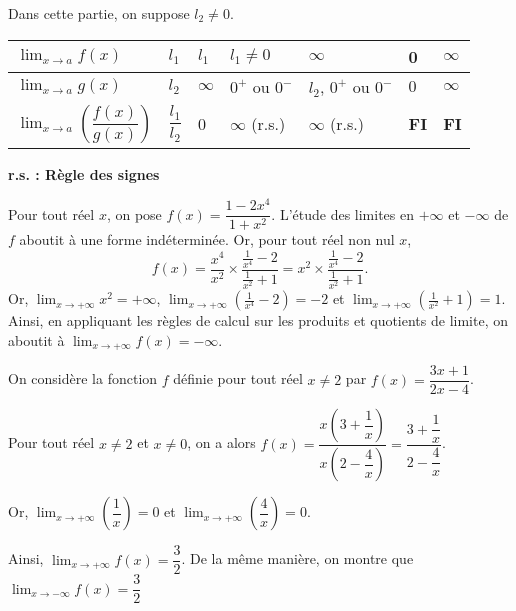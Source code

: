 \documentclass[11pt,fleqn, openany]{book} %
\begin{document}
\begin{proposition} Dans cette partie, on suppose $l_2 \neq 0$.
\begin{center}

\begin{tabularx}{\linewidth}{|l|X|X|X|X|X|X|}
\hline
$\displaystyle \lim_{x \to a} f(x)$ & $l_1 $ & $l_1$ & $l_1 \neq 0$ & $\infty$ & 0 & $\infty$ \\
\hline
$\displaystyle \lim_{x \to a} g(x)$ & $l_2$ & $\infty$ &  $0^+$ ou $0^-$ & $l_2$, $0^+$ ou $0^-$  & $0$ & $\infty$ \\
\hline
$\displaystyle \lim_{x \to a} \left(\dfrac{f(x)}{g(x)}\right)$ & $\dfrac{l_1}{l_2}$ & 0 & $\infty$ (r.s.) & $\infty$ (r.s.) & \textbf{FI} & \textbf{FI} \\
\hline
\end{tabularx}

 \textbf{r.s. : Règle des signes}
 \end{center} \vspace{-1cm}
\end{proposition}

\begin{example}Pour tout réel $x$, on pose $f(x)=\dfrac{1-2x^4}{1+x^2}$. L'étude des limites en $+\infty$ et $-\infty$ de $f$ aboutit à une forme indéterminée. Or, pour tout réel non nul $x$,
\[f(x)= \dfrac{x^4}{x^2} \times \dfrac{\frac{1}{x^4}-2}{\frac{1}{x^2}+1} = x^2 \times \dfrac{\frac{1}{x^4}-2}{\frac{1}{x^2}+1}.\]
Or, $\displaystyle\lim_{x \to +\infty}x^2=+\infty$, $\displaystyle\lim_{x \to +\infty}\left(\frac{1}{x^4}-2\right)=-2$ et $\displaystyle\lim_{x \to +\infty}\left(\frac{1}{x^2}+1\right)=1$. Ainsi, en appliquant les règles de calcul sur les produits et quotients de limite, on aboutit à $\displaystyle\lim_{x \to +\infty}f(x)=-\infty$.\end{example}

\begin{example}On considère la fonction $f$ définie pour tout réel $x\neq 2$ par $f(x)=\dfrac{3x+1}{2x-4}$.

Pour tout réel $x\neq 2$ et $x\neq 0$, on a alors $f(x)=\dfrac{x\left(3+\dfrac{1}{x}\right)}{x\left(2-\dfrac{4}{x}\right)}=\dfrac{3+\dfrac{1}{x}}{2-\dfrac{4}{x}}$.

Or, $\displaystyle \lim_{x \to +\infty} \left(\dfrac{1}{x}\right) = 0$ et $\displaystyle \lim_{x \to +\infty} \left(\dfrac{4}{x}\right) = 0$.

Ainsi, $\displaystyle \lim_{x \to +\infty} f(x)=\dfrac{3}{2}$. De la même manière, on montre que $\displaystyle \lim_{x \to -\infty} f(x)=\dfrac{3}{2}$\end{example}
\end{document}
